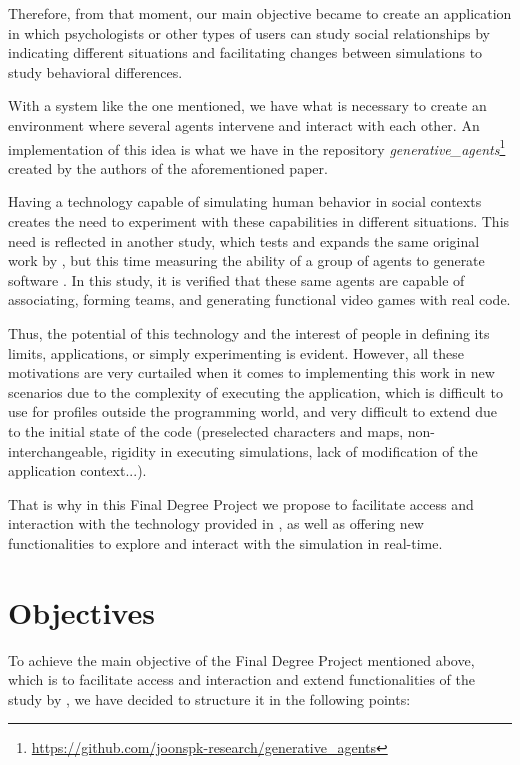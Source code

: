 Therefore, from that moment, our main objective became to create an application in which psychologists or other types of users can study social relationships by indicating different situations and facilitating changes between simulations to study behavioral differences.

With a system like the one mentioned, we have what is necessary to create an environment where several agents intervene and interact with each other. An implementation of this idea is what we have in the repository {\textit{generative\_agents}}\footnote{\url{https://github.com/joonspk-research/generative_agents}} created by the authors of the aforementioned paper.

Having a technology capable of simulating human behavior in social contexts creates the need to experiment with these capabilities in different situations. This need is reflected in another study, which tests and expands the same original work by \cite{park2023generative}, but this time measuring the ability of a group of agents to generate software \citep{qian2023communicative}. In this study, it is verified that these same agents are capable of associating, forming teams, and generating functional video games with real code.

Thus, the potential of this technology and the interest of people in defining its limits, applications, or simply experimenting is evident. However, all these motivations are very curtailed when it comes to implementing this work in new scenarios due to the complexity of executing the application, which is difficult to use for profiles outside the programming world, and very difficult to extend due to the initial state of the code (preselected characters and maps, non-interchangeable, rigidity in executing simulations, lack of modification of the application context...).

That is why in this Final Degree Project we propose to facilitate access and interaction with the technology provided in \ga, as well as offering new functionalities to explore and interact with the simulation in real-time.

\section{Objectives}

To achieve the main objective of the Final Degree Project mentioned above, which is to facilitate access and interaction and extend functionalities of the study by \ga, we have decided to structure it in the following points:


